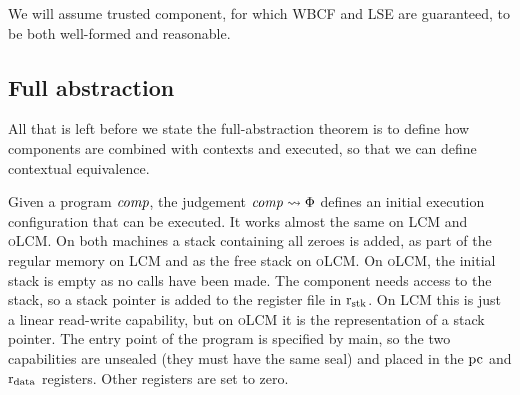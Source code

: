 \documentclass[acmsmall,review,showframe]{acmart}\settopmatter{printfolios=true,printccs=false,printacmref=false}
\newcommand{\trgcm}{\textsc{LCM}}
\newcommand{\srccm}{\textsc{oLCM}}
\begin{document}
We will assume trusted component, for which WBCF and LSE are guaranteed, to be both well-formed and reasonable. 




\subsection{Full abstraction}
All that is left before we state the full-abstraction theorem is to define how components are combined with contexts and executed, so that we can define contextual equivalence.

Given a program $\mathit{comp}$, the judgement $\mathit{comp} \rightsquigarrow \Phi$ defines an initial execution configuration that can be executed.
It works almost the same on \trgcm{} and \srccm{}.
On both machines a stack containing all zeroes is added, as part of the regular memory on \trgcm{} and as the free stack on \srccm{}.
On \srccm{}, the initial stack is empty as no calls have been made.
The component needs access to the stack, so a stack pointer is added to the register file in $\mathrm{r}_\mathrm{stk}$.
On \trgcm{} this is just a linear read-write capability, but on \srccm{} it is the representation of a stack pointer.
The entry point of the program is specified by main, so the two capabilities are unsealed (they must have the same seal) and placed in the $\mathrm{pc}$ and $\mathrm{r}_\mathrm{data}$ registers.
Other registers are set to zero.
\end{document}
